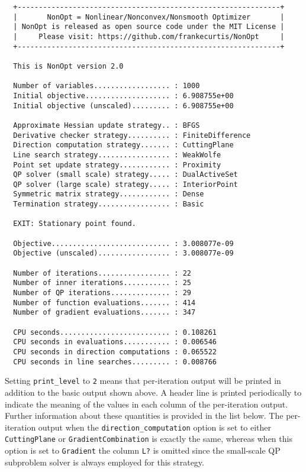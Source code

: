 \documentclass{article}
\begin{document}
\begin{verbatim}
  +--------------------------------------------------------------+
  |       NonOpt = Nonlinear/Nonconvex/Nonsmooth Optimizer       |
  | NonOpt is released as open source code under the MIT License |
  |     Please visit: https://github.com/frankecurtis/NonOpt     |
  +--------------------------------------------------------------+
  
  This is NonOpt version 2.0
  
  Number of variables.................. : 1000
  Initial objective.................... : 6.908755e+00
  Initial objective (unscaled)......... : 6.908755e+00
  
  Approximate Hessian update strategy.. : BFGS
  Derivative checker strategy.......... : FiniteDifference
  Direction computation strategy....... : CuttingPlane
  Line search strategy................. : WeakWolfe
  Point set update strategy............ : Proximity
  QP solver (small scale) strategy..... : DualActiveSet
  QP solver (large scale) strategy..... : InteriorPoint
  Symmetric matrix strategy............ : Dense
  Termination strategy................. : Basic
  
  EXIT: Stationary point found.
  
  Objective............................ : 3.008077e-09
  Objective (unscaled)................. : 3.008077e-09
  
  Number of iterations................. : 22
  Number of inner iterations........... : 25
  Number of QP iterations.............. : 29
  Number of function evaluations....... : 414
  Number of gradient evaluations....... : 347
  
  CPU seconds.......................... : 0.108261
  CPU seconds in evaluations........... : 0.006546
  CPU seconds in direction computations : 0.065522
  CPU seconds in line searches......... : 0.008766
\end{verbatim}

Setting \texttt{print\_level} to \texttt{2} means that per-iteration output will be printed in addition to the basic output shown above.  A header line is printed periodically to indicate the meaning of the values in each column of the per-iteration output.  Further information about these quantities is provided in the list below.  The per-iteration output when the \texttt{direction\_computation} option is set to either \texttt{CuttingPlane} or \texttt{GradientCombination} is exactly the same, whereas when this option is set to \texttt{Gradient} the column \texttt{L?} is omitted since the small-scale QP subproblem solver is always employed for this strategy.
\end{document}
